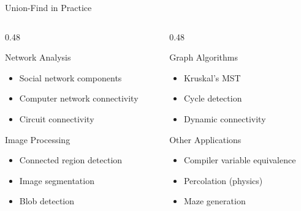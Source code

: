 \documentclass[aspectratio=169,xcolor=dvipsnames]{beamer}
\begin{document}
\begin{frame}{Union-Find in Practice}
  \begin{columns}
    \begin{column}{0.48\textwidth}
      \begin{block}{Network Analysis}
        \begin{itemize}
          \item Social network components
          \item Computer network connectivity
          \item Circuit connectivity
        \end{itemize}
      \end{block}

      \begin{block}{Image Processing}
        \begin{itemize}
          \item Connected region detection
          \item Image segmentation
          \item Blob detection
        \end{itemize}
      \end{block}
    \end{column}
    \begin{column}{0.48\textwidth}
      \begin{block}{Graph Algorithms}
        \begin{itemize}
          \item Kruskal's MST
          \item Cycle detection
          \item Dynamic connectivity
        \end{itemize}
      \end{block}

      \begin{block}{Other Applications}
        \begin{itemize}
          \item Compiler variable equivalence
          \item Percolation (physics)
          \item Maze generation
        \end{itemize}
      \end{block}
    \end{column}
  \end{columns}
\end{frame}
\end{document}
